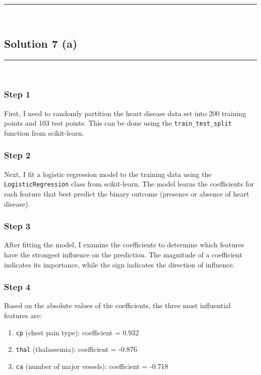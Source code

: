 \documentclass{article}
\begin{document}
\noindent\rule{\textwidth}{0.4pt}\\

\subsection*{Solution 7 (a)}
\noindent\rule{\textwidth}{0.4pt}\\

\subsubsection*{Step 1}
\parbox{\textwidth}{
First, I need to randomly partition the heart disease data set into 200 training points and 103 test points. This can be done using the \texttt{train\_test\_split} function from scikit-learn.
}

\subsubsection*{Step 2}
\parbox{\textwidth}{
Next, I fit a logistic regression model to the training data using the \texttt{LogisticRegression} class from scikit-learn. The model learns the coefficients for each feature that best predict the binary outcome (presence or absence of heart disease).
}

\subsubsection*{Step 3}
\parbox{\textwidth}{
After fitting the model, I examine the coefficients to determine which features have the strongest influence on the prediction. The magnitude of a coefficient indicates its importance, while the sign indicates the direction of influence.
}

\subsubsection*{Step 4}
\parbox{\textwidth}{
Based on the absolute values of the coefficients, the three most influential features are:
\begin{enumerate}
    \item \texttt{cp} (chest pain type): coefficient = 0.932
    \item \texttt{thal} (thalassemia): coefficient = -0.876
    \item \texttt{ca} (number of major vessels): coefficient = -0.718
\end{enumerate}
}
\end{document}
